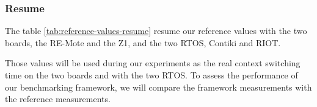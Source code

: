 \subsubsection{Resume}
The table \ref{tab:reference-values-resume} resume our reference values with the two boards, the RE-Mote and the Z1, and the two RTOS, Contiki and RIOT.



Those values will be used during our experiments as the real context switching time on the two boards and with the two RTOS.
To assess the performance of our benchmarking framework, we will compare the framework measurements with the reference measurements.